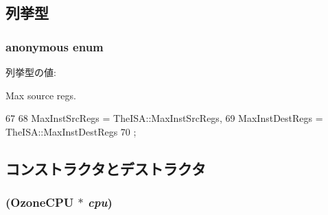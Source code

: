 \subsection{列挙型}
\hypertarget{classOzoneDynInst_ab48899087cc647f0f791ed0c459adc53}{
\subsubsection[{"@35}]{\setlength{\rightskip}{0pt plus 5cm}anonymous enum}}
\label{classOzoneDynInst_ab48899087cc647f0f791ed0c459adc53}
\begin{Desc}
\item[列挙型の値: ]\par
\begin{description}
\item[{\em 
\hypertarget{classOzoneDynInst_ab48899087cc647f0f791ed0c459adc53a17b78fe104e3bf28fca535a040514084}{
MaxInstSrcRegs}
\label{classOzoneDynInst_ab48899087cc647f0f791ed0c459adc53a17b78fe104e3bf28fca535a040514084}
}]\item[{\em 
\hypertarget{classOzoneDynInst_ab48899087cc647f0f791ed0c459adc53a6a2e9b17a83d01eb4ee6bbdd739be9eb}{
MaxInstDestRegs}
\label{classOzoneDynInst_ab48899087cc647f0f791ed0c459adc53a6a2e9b17a83d01eb4ee6bbdd739be9eb}
}]Max source regs. \end{description}
\end{Desc}




\begin{DoxyCode}
67          {
68         MaxInstSrcRegs = TheISA::MaxInstSrcRegs,
69         MaxInstDestRegs = TheISA::MaxInstDestRegs
70     };
\end{DoxyCode}


\subsection{コンストラクタとデストラクタ}
\hypertarget{classOzoneDynInst_a0d71ba7c29db1d27e57fe7c78e711c6d}{
\subsubsection[{OzoneDynInst}]{ ({\bf OzoneCPU} $\ast$ {\em cpu})}}
\label{classOzoneDynInst_a0d71ba7c29db1d27e57fe7c78e711c6d}



